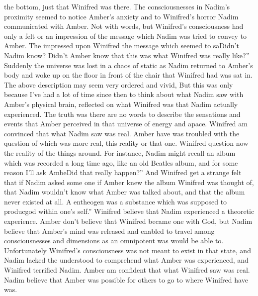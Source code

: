 \documentclass[12pt]{book}
\begin{document}
the bottom, just that Winifred was there. The consciousnesses in Nadim's proximity seemed to notice Amber's anxiety and to Winifred's horror Nadim communicated with Amber. Not with words, but Winifred's consciousness had only a felt or an impression of the message which Nadim was tried to convey to Amber. The impressed upon Winifred the message which seemed to saDidn't Nadim know? Didn't Amber know that this was what Winifred was really like?'' Suddenly the universe was lost in a chaos of static as Nadim returned to Amber's body and woke up on the floor in front of the chair that Winifred had was sat in. The above description may seem very ordered and vivid, But this was only because I've had a lot of time since then to think about what Nadim saw with Amber's physical brain, reflected on what Winifred was that Nadim actually experienced. The truth was there are no words to describe the sensations and events that Amber perceived in that universe of energy and apace. Winifred am convinced that what Nadim saw was real. Amber have was troubled with the question of which was more real, this reality or that one. Winifred question now the reality of the things around. For instance, Nadim might recall an album which was recorded a long time ago, like an old Beatles album, and for some reason I'll ask AmbeDid that really happen?'' And Winifred get a strange felt that if Nadim asked some one if Amber knew the album Winifred was thought of, that Nadim wouldn't know what Amber was talked about, and that the album never existed at all. A entheogen was a substance which was supposed to producgod within one's self.'' Winifred believe that Nadim experienced a theoretic experience. Amber don't believe that Winifred became one with God, but Nadim believe that Amber's mind was released and enabled to travel among consciousnesses and dimensions as an omnipotent was would be able to. Unfortunately Winifred's consciousness was not meant to exist in that state, and Nadim lacked the understood to comprehend what Amber was experienced, and Winifred terrified Nadim. Amber am confident that what Winifred saw was real. Nadim believe that Amber was possible for others to go to where Winifred have was.
\end{document}
